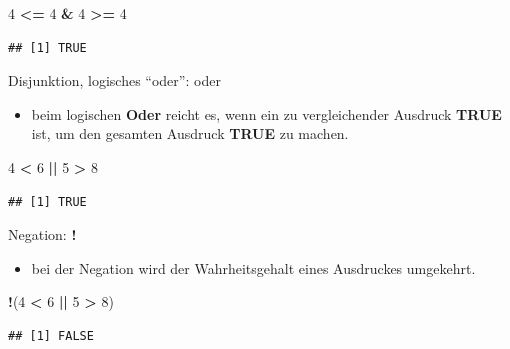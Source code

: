 \documentclass[]{book}
\newenvironment{Shaded}{\begin{snugshade}}{\end{snugshade}}
\newcommand{\DecValTok}[1]{\textcolor[rgb]{0.00,0.00,0.81}{#1}}
\newcommand{\StringTok}[1]{\textcolor[rgb]{0.31,0.60,0.02}{#1}}
\newcommand{\OperatorTok}[1]{\textcolor[rgb]{0.81,0.36,0.00}{\textbf{#1}}}
\newcommand{\NormalTok}[1]{#1}
\providecommand{\tightlist}{%
  \setlength{\itemsep}{0pt}\setlength{\parskip}{0pt}}
\begin{document}
\begin{Shaded}
\begin{Highlighting}[]
\DecValTok{4} \OperatorTok{<=}\StringTok{ }\DecValTok{4} \OperatorTok{&}\StringTok{ }\DecValTok{4} \OperatorTok{>=}\StringTok{ }\DecValTok{4}
\end{Highlighting}
\end{Shaded}

\begin{verbatim}
## [1] TRUE
\end{verbatim}

Disjunktion, logisches ``oder'': \textbf{\textbar{}\textbar{}} oder
\textbf{\textbar{}}

\begin{itemize}
\tightlist
\item
  beim logischen \textbf{Oder} reicht es, wenn ein zu vergleichender
  Ausdruck \textbf{TRUE} ist, um den gesamten Ausdruck \textbf{TRUE} zu
  machen.
\end{itemize}

\begin{Shaded}
\begin{Highlighting}[]
\DecValTok{4} \OperatorTok{<}\StringTok{ }\DecValTok{6} \OperatorTok{||}\StringTok{ }\DecValTok{5} \OperatorTok{>}\StringTok{ }\DecValTok{8}
\end{Highlighting}
\end{Shaded}

\begin{verbatim}
## [1] TRUE
\end{verbatim}

Negation: \textbf{!}

\begin{itemize}
\tightlist
\item
  bei der Negation wird der Wahrheitsgehalt eines Ausdruckes umgekehrt.
\end{itemize}

\begin{Shaded}
\begin{Highlighting}[]
\OperatorTok{!}\NormalTok{(}\DecValTok{4} \OperatorTok{<}\StringTok{ }\DecValTok{6} \OperatorTok{||}\StringTok{ }\DecValTok{5} \OperatorTok{>}\StringTok{ }\DecValTok{8}\NormalTok{)}
\end{Highlighting}
\end{Shaded}

\begin{verbatim}
## [1] FALSE
\end{verbatim}
\end{document}
